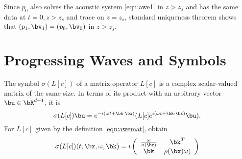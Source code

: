 Since $p_0$ also solves the acoustic system \ref{eqn:awe1} in $z>z_s$
and has the same data at $t=0, z>z_s$ and trace on $z=z_s$, standard
uniqueness theorem shows that $(p_1,\bv_1) = (p_0, \bv_0)$ in $z>z_s$.



\section{Progressing Waves and Symbols}

The symbol $\sigma(L[c])$ of a matrix operator $L[c]$ is a complex scalar-valued matrix of the same size. In terms of its product with an arbitrary vector $\bu \in \bR^{d+1}$, it is
\[
  \sigma(L[c]) \bu = e^{-i(\omega t + \bk \cdot \bx)} (L[c]e^{i(\omega t + \bk \cdot \bx)}\bu).
\]
For $L[c]$ given by the definition \ref{eqn:awemat}, obtain
\begin{equation}
  \sigma(L[c])(t,\bx,\omega,\bk) = i\left(
    \begin{array}{cc}
      \frac{\omega}{\kappa(\bx)} & \bk^T \\
      \bk & \rho(\bx) \omega)
    \end{array}
  \right)
\end{equation}

